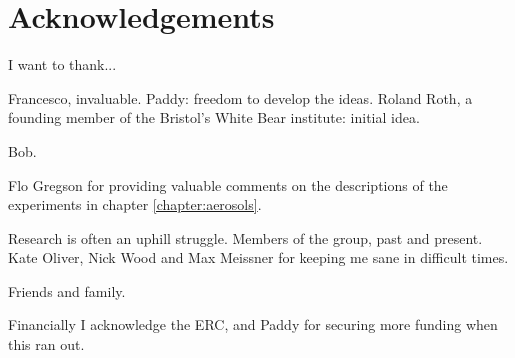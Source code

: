 \chapter*{Acknowledgements}
I want to thank...

Francesco, invaluable.
Paddy: freedom to develop the ideas.
Roland Roth, a founding member of the Bristol's White Bear institute: initial idea.

Bob.

Flo Gregson for providing valuable comments on the descriptions of the experiments in chapter \ref{chapter:aerosols}.

Research is often an uphill struggle.
Members of the group, past and present.
Kate Oliver, Nick Wood and Max Meissner for keeping me sane in difficult times.

Friends and family.

Financially I acknowledge the ERC, and Paddy for securing more funding when this ran out.
